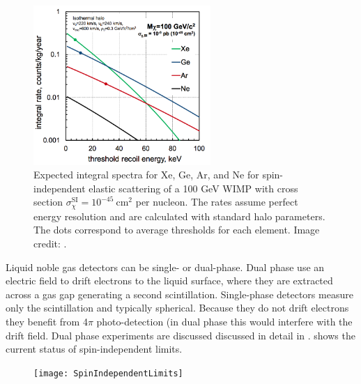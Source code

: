 \begin{figure}
\centering
\includegraphics[width=0.6\textwidth]{IntegralRateTargets}
\caption{Expected integral spectra for Xe, Ge, Ar, and Ne for spin-independent elastic scattering of a 100 GeV WIMP with cross section
$\sigma_{\chi}^{\mathrm{SI}} = 10^{-45}\ \mathrm{cm^{2}}$ per nucleon.  The rates assume perfect energy resolution and are calculated with
standard halo parameters.  The dots correspond to average thresholds for each element.  Image credit: .}
\label{fig:material_wimp_rate}
\end{figure}

Liquid noble gas detectors can be single- or dual-phase.  Dual phase use an electric field to drift electrons to the liquid surface, where
they are extracted across a gas gap generating a second scintillation.  Single-phase detectors measure only the scintillation and typically
spherical.  Because they do not drift electrons they benefit from 4$\pi$ photo-detection (in dual phase this would interfere with the
drift field.  Dual phase experiments are discussed discussed in detail in .   shows the
current status of spin-independent limits.

\begin{figure}
\centering
\texttt{[image: SpinIndependentLimits]}
\label{fig:si_limits}
\end{figure}


